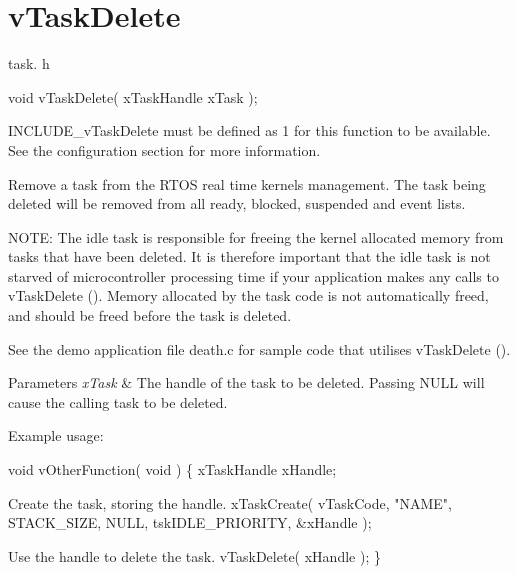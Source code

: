 \hypertarget{group__v_task_delete}{\section{v\-Task\-Delete}
\label{group__v_task_delete}
}
task. h 
\begin{DoxyPre}void vTaskDelete( xTaskHandle xTask );\end{DoxyPre}


I\-N\-C\-L\-U\-D\-E\-\_\-v\-Task\-Delete must be defined as 1 for this function to be available. See the configuration section for more information.

Remove a task from the R\-T\-O\-S real time kernels management. The task being deleted will be removed from all ready, blocked, suspended and event lists.

N\-O\-T\-E\-: The idle task is responsible for freeing the kernel allocated memory from tasks that have been deleted. It is therefore important that the idle task is not starved of microcontroller processing time if your application makes any calls to v\-Task\-Delete (). Memory allocated by the task code is not automatically freed, and should be freed before the task is deleted.

See the demo application file death.\-c for sample code that utilises v\-Task\-Delete ().


\begin{DoxyParams}{Parameters}
{\em x\-Task} & The handle of the task to be deleted. Passing N\-U\-L\-L will cause the calling task to be deleted.\\
\hline
\end{DoxyParams}
Example usage\-: 
\begin{DoxyPre}
 void vOtherFunction( void )
 \{
 xTaskHandle xHandle;\end{DoxyPre}



\begin{DoxyPre}Create the task, storing the handle.
         xTaskCreate( vTaskCode, "NAME", STACK\_SIZE, NULL, tskIDLE\_PRIORITY, \&xHandle );\end{DoxyPre}



\begin{DoxyPre}Use the handle to delete the task.
         vTaskDelete( xHandle );
 \}
   \end{DoxyPre}
 